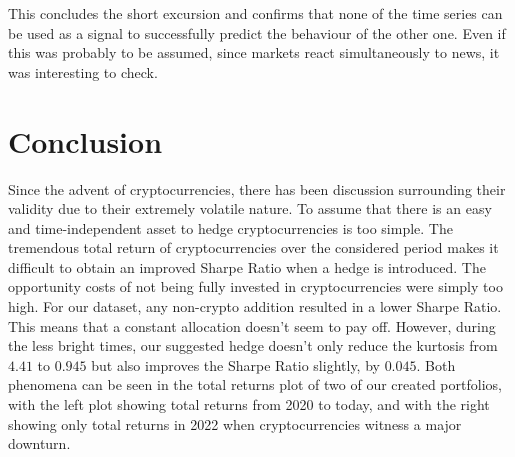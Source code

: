 \documentclass[11pt]{article}
\begin{document}
\noindent This concludes the short excursion and confirms that none of the time series can be used as a signal to successfully predict the behaviour of the other one. Even if this was probably to be assumed, since markets react simultaneously to news, it was interesting to check.

\clearpage
\section{Conclusion} \label{sec:results}
Since the advent of cryptocurrencies, there has been discussion surrounding their validity due to their extremely volatile nature. To assume that there is an easy and time-independent asset to hedge cryptocurrencies is too simple. The tremendous total return of cryptocurrencies over the considered period makes it difficult to obtain an improved Sharpe Ratio when a hedge is introduced. The opportunity costs of not being fully invested in cryptocurrencies were simply too high. For our dataset, any non-crypto addition resulted in a lower Sharpe Ratio. This means that a constant allocation doesn't seem to pay off. However, during the less bright times, our suggested hedge doesn't only reduce the kurtosis from $4.41$ to $0.945$ but also improves the Sharpe Ratio slightly, by $0.045$. Both phenomena can be seen in the total returns plot of two of our created portfolios, with the left plot showing total returns from 2020 to today, and with the right showing only total returns in 2022 when cryptocurrencies witness a major downturn. 
\end{document}
